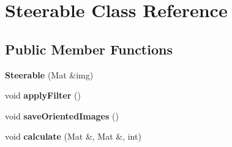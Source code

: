 \hypertarget{classSteerable}{\section{\-Steerable \-Class \-Reference}
\label{classSteerable}
}
\subsection*{\-Public \-Member \-Functions}
\begin{DoxyCompactItemize}
\item 
\hypertarget{classSteerable_a2ee227ab0b3ae8e1a037c761e1c7b02e}{{\bfseries \-Steerable} (\-Mat \&img)}\label{classSteerable_a2ee227ab0b3ae8e1a037c761e1c7b02e}

\item 
\hypertarget{classSteerable_aec3255470fad45d785cd7a9933d50263}{void {\bfseries apply\-Filter} ()}\label{classSteerable_aec3255470fad45d785cd7a9933d50263}

\item 
\hypertarget{classSteerable_a3a1e236f08e4e817596cdc6a70dc2a24}{void {\bfseries save\-Oriented\-Images} ()}\label{classSteerable_a3a1e236f08e4e817596cdc6a70dc2a24}

\item 
\hypertarget{classSteerable_a8628a76a7e6f5600b6d9310f1aa6eac8}{void {\bfseries calculate} (\-Mat \&, \-Mat \&, int)}\label{classSteerable_a8628a76a7e6f5600b6d9310f1aa6eac8}

\end{DoxyCompactItemize}
